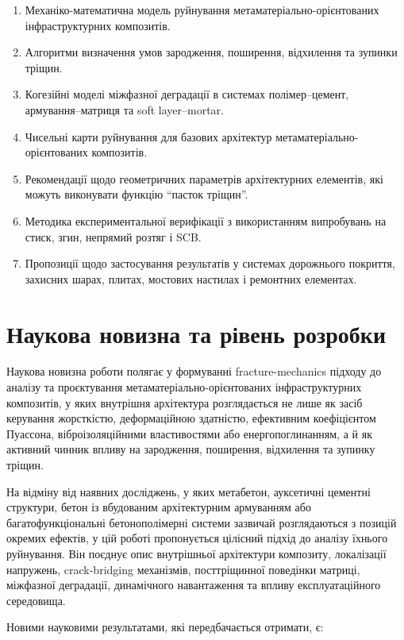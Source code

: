 \documentclass[12pt,a4paper]{article}
\begin{document}
\begin{enumerate}
	\item Механіко-математична модель руйнування метаматеріально-орієнтованих інфраструктурних композитів.
	\item Алгоритми визначення умов зародження, поширення, відхилення та зупинки тріщин.
	\item Когезійні моделі міжфазної деградації в системах полімер--цемент, армування--матриця та soft layer--mortar.
	\item Чисельні карти руйнування для базових архітектур метаматеріально-орієнтованих композитів.
	\item Рекомендації щодо геометричних параметрів архітектурних елементів, які можуть виконувати функцію ``пасток тріщин''.
	\item Методика експериментальної верифікації з використанням випробувань на стиск, згин, непрямий розтяг і SCB.
	\item Пропозиції щодо застосування результатів у системах дорожнього покриття, захисних шарах, плитах, мостових настилах і ремонтних елементах.
\end{enumerate}

\section{Наукова новизна та рівень розробки}

Наукова новизна роботи полягає у формуванні fracture-mechanics підходу до аналізу та проєктування метаматеріально-орієнтованих інфраструктурних композитів, у яких внутрішня архітектура розглядається не лише як засіб керування жорсткістю, деформаційною здатністю, ефективним коефіцієнтом Пуассона, віброізоляційними властивостями або енергопоглинанням, а й як активний чинник впливу на зародження, поширення, відхилення та зупинку тріщин.

На відміну від наявних досліджень, у яких метабетон, ауксетичні цементні структури, бетон із вбудованим архітектурним армуванням або багатофункціональні бетонополімерні системи зазвичай розглядаються з позицій окремих ефектів, у цій роботі пропонується цілісний підхід до аналізу їхнього руйнування. Він поєднує опис внутрішньої архітектури композиту, локалізації напружень, crack-bridging механізмів, посттріщинної поведінки матриці, міжфазної деградації, динамічного навантаження та впливу експлуатаційного середовища.

Новими науковими результатами, які передбачається отримати, є:
\end{document}
